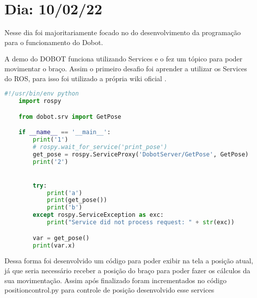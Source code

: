 \chapter{Dia: 10/02/22}
\label{chap:10-02-22}

Nesse dia foi majoritariamente focado no do desenvolvimento da programação para o funcionamento do Dobot.

A demo do DOBOT funciona utilizando Services e o \cite{Dobotand76:online} fez um tópico para poder movimentar o braço. Assim o primeiro desafio foi aprender a utilizar os Services do ROS, para isso foi utilizado a própria wiki oficial \cite{rospyOve3:online}.

\begin{lstlisting}[language=Python]
    #!/usr/bin/env python
    import rospy

    from dobot.srv import GetPose

    if __name__ == '__main__':
        print('1')
        # rospy.wait_for_service('print_pose')
        get_pose = rospy.ServiceProxy('DobotServer/GetPose', GetPose)
        print('2')


        try:
            print('a')
            print(get_pose())
            print('b')
        except rospy.ServiceException as exc:
            print("Service did not process request: " + str(exc))

        var = get_pose()
        print(var.x)
\end{lstlisting}

Dessa forma foi desenvolvido um código para poder exibir na tela a posição atual, já que seria necessário receber a posição do braço para poder fazer os cálculos da sua movimentação. Assim após finalizado foram incrementados no código position\underline{\space}control.py para controle de posição desenvolvido esse services

